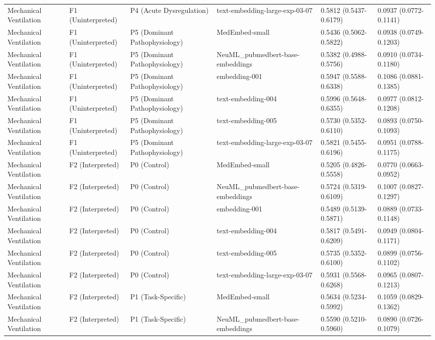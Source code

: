 \begin{tabular}{llllll}
Mechanical Ventilation & F1 (Uninterpreted) & P4 (Acute Dysregulation) & text-embedding-large-exp-03-07 & 0.5812 (0.5437-0.6179) & 0.0937 (0.0772-0.1141) \\
Mechanical Ventilation & F1 (Uninterpreted) & P5 (Dominant Pathophysiology) & MedEmbed-small & 0.5436 (0.5062-0.5822) & 0.0938 (0.0749-0.1203) \\
Mechanical Ventilation & F1 (Uninterpreted) & P5 (Dominant Pathophysiology) & NeuML\_pubmedbert-base-embeddings & 0.5382 (0.4988-0.5756) & 0.0910 (0.0734-0.1180) \\
Mechanical Ventilation & F1 (Uninterpreted) & P5 (Dominant Pathophysiology) & embedding-001 & 0.5947 (0.5588-0.6338) & 0.1086 (0.0881-0.1385) \\
Mechanical Ventilation & F1 (Uninterpreted) & P5 (Dominant Pathophysiology) & text-embedding-004 & 0.5996 (0.5648-0.6355) & 0.0977 (0.0812-0.1208) \\
Mechanical Ventilation & F1 (Uninterpreted) & P5 (Dominant Pathophysiology) & text-embedding-005 & 0.5730 (0.5352-0.6110) & 0.0893 (0.0750-0.1093) \\
Mechanical Ventilation & F1 (Uninterpreted) & P5 (Dominant Pathophysiology) & text-embedding-large-exp-03-07 & 0.5821 (0.5455-0.6196) & 0.0951 (0.0788-0.1175) \\
Mechanical Ventilation & F2 (Interpreted) & P0 (Control) & MedEmbed-small & 0.5205 (0.4826-0.5558) & 0.0770 (0.0663-0.0952) \\
Mechanical Ventilation & F2 (Interpreted) & P0 (Control) & NeuML\_pubmedbert-base-embeddings & 0.5724 (0.5319-0.6109) & 0.1007 (0.0827-0.1297) \\
Mechanical Ventilation & F2 (Interpreted) & P0 (Control) & embedding-001 & 0.5489 (0.5139-0.5871) & 0.0889 (0.0733-0.1148) \\
Mechanical Ventilation & F2 (Interpreted) & P0 (Control) & text-embedding-004 & 0.5817 (0.5491-0.6209) & 0.0949 (0.0804-0.1171) \\
Mechanical Ventilation & F2 (Interpreted) & P0 (Control) & text-embedding-005 & 0.5735 (0.5352-0.6100) & 0.0899 (0.0756-0.1102) \\
Mechanical Ventilation & F2 (Interpreted) & P0 (Control) & text-embedding-large-exp-03-07 & 0.5931 (0.5568-0.6268) & 0.0965 (0.0807-0.1213) \\
Mechanical Ventilation & F2 (Interpreted) & P1 (Task-Specific) & MedEmbed-small & 0.5634 (0.5234-0.5992) & 0.1059 (0.0829-0.1362) \\
Mechanical Ventilation & F2 (Interpreted) & P1 (Task-Specific) & NeuML\_pubmedbert-base-embeddings & 0.5590 (0.5210-0.5960) & 0.0890 (0.0726-0.1079) \\

\end{tabular}
